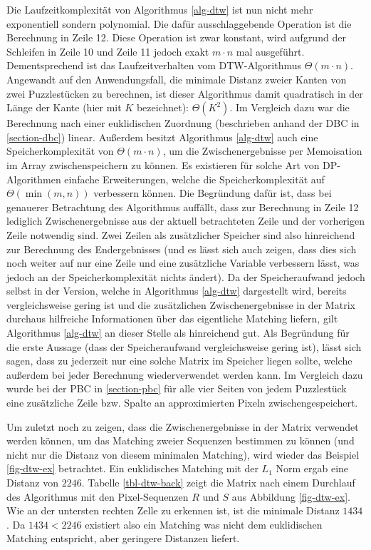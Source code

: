 \documentclass{whswinvcbook}
\begin{document}
Die Laufzeitkomplexität von Algorithmus \ref{alg-dtw} ist nun nicht mehr exponentiell sondern polynomial. Die dafür ausschlaggebende Operation ist die Berechnung in Zeile 12. Diese Operation ist zwar konstant, wird aufgrund der Schleifen in Zeile 10 und Zeile 11 jedoch exakt $m\cdot n$ mal ausgeführt. Dementsprechend ist das Laufzeitverhalten vom DTW-Algorithmus $\Theta(m\cdot n)$. Angewandt auf den Anwendungsfall, die minimale Distanz zweier Kanten von zwei Puzzlestücken zu berechnen, ist dieser Algorithmus damit quadratisch in der Länge der Kante (hier mit $K$ bezeichnet): $\Theta(K^2)$. Im Vergleich dazu war die Berechnung nach einer euklidischen Zuordnung (beschrieben anhand der DBC in \ref{section-dbc}) linear. Außerdem besitzt Algorithmus \ref{alg-dtw} auch eine Speicherkomplexität von $\Theta(m\cdot n)$, um die Zwischenergebnisse per Memoisation im Array zwischenspeichern zu können. Es existieren für solche Art von DP-Algorithmen einfache Erweiterungen, welche die Speicherkomplexität auf $\Theta(\min(m,n))$ verbessern können. Die Begründung dafür ist, dass bei genauerer Betrachtung des Algorithmus auffällt, dass zur Berechnung in Zeile 12 lediglich Zwischenergebnisse aus der aktuell betrachteten Zeile und der vorherigen Zeile notwendig sind. Zwei Zeilen als zusätzlicher Speicher sind also hinreichend zur Berechnung des Endergebnisses (und es lässt sich auch zeigen, dass dies sich noch weiter auf nur eine Zeile und eine zusätzliche Variable verbessern lässt, was jedoch an der Speicherkomplexität nichts ändert). Da der Speicheraufwand jedoch selbst in der Version, welche in Algorithmus \ref{alg-dtw} dargestellt wird, bereits vergleichsweise gering ist und die zusätzlichen Zwischenergebnisse in der Matrix durchaus hilfreiche Informationen über das eigentliche Matching liefern, gilt Algorithmus \ref{alg-dtw} an dieser Stelle als hinreichend gut. Als Begründung für die erste Aussage (dass der Speicheraufwand vergleichsweise gering ist), lässt sich sagen, dass zu jederzeit nur eine solche Matrix im Speicher liegen sollte, welche außerdem bei jeder Berechnung wiederverwendet werden kann. Im Vergleich dazu wurde bei der PBC in \ref{section-pbc} für alle vier Seiten von jedem Puzzlestück eine zusätzliche Zeile bzw. Spalte an approximierten Pixeln zwischengespeichert.

Um zuletzt noch zu zeigen, dass die Zwischenergebnisse in der Matrix verwendet werden können, um das Matching zweier Sequenzen bestimmen zu können (und nicht nur die Distanz von diesem minimalen Matching), wird wieder das Beispiel \ref{fig-dtw-ex} betrachtet. Ein euklidisches Matching mit der $L_1$ Norm ergab eine Distanz von $2246$. Tabelle \ref{tbl-dtw-back} zeigt die Matrix nach einem Durchlauf des Algorithmus mit den Pixel-Sequenzen $R$ und $S$ aus Abbildung \ref{fig-dtw-ex}. Wie an der untersten rechten Zelle zu erkennen ist, ist die minimale Distanz $1434$. Da $1434<2246$ existiert also ein Matching was nicht dem euklidischen Matching entspricht, aber geringere Distanzen liefert.
\end{document}
